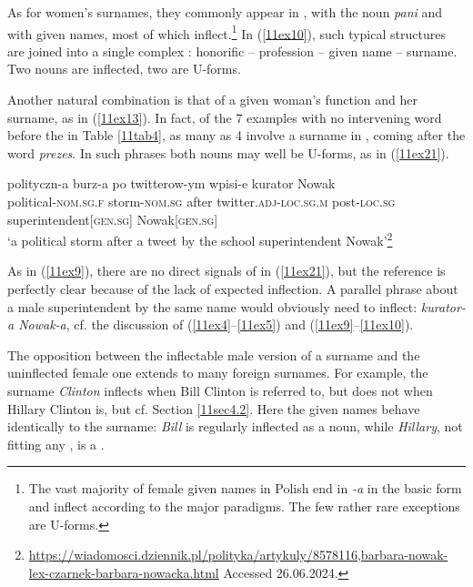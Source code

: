\documentclass[output=paper,colorlinks,citecolor=brown]{langscibook}
\begin{document}
As for women's surnames, they commonly appear in , with the noun \emph{pani} and with given names, most of which inflect.\footnote{The vast majority of female given names in Polish end in \emph{-a} in the basic form and inflect according to the major  paradigms. The few rather rare exceptions are U-forms.\label{11ftn18}} In (\ref{11ex10}), such typical structures are joined into a single complex : honorific -- profession -- given name -- surname. Two nouns are inflected, two are U-forms.

Another natural combination is that of a given woman's function and her surname, as in (\ref{11ex13}). In fact, of the 7 examples with no intervening word before the  in Table \ref{11tab4}, as many as 4 involve a surname in , coming after the word \emph{prezes}. In such phrases both nouns may well be U-forms, as in (\ref{11ex21}).

\begin{exe}
	\ex \label{11ex21}
	\gll polityczn-a burz-a po twitterow-ym wpisi-e kurator Nowak \\
	political-\textsc{nom.sg.f} storm-\textsc{nom.sg} after twitter.\textsc{adj-loc.sg.m} post-\textsc{loc.sg} superintendent[\textsc{gen.sg}] Nowak[\textsc{gen.sg}] \\
	\trans ‘a political storm after a tweet by the school superintendent Nowak’\footnote{\url{https://wiadomosci.dziennik.pl/polityka/artykuly/8578116,barbara-nowak-lex-czarnek-barbara-nowacka.html} Accessed 26.06.2024.}
\end{exe}

As in (\ref{11ex9}), there are no direct signals of   in (\ref{11ex21}), but the  reference is perfectly clear because of the lack of expected inflection. A parallel phrase about a male superintendent by the same name would obviously need to inflect: \emph{kurator-a Nowak-a}, cf. the discussion of (\ref{11ex4}--\ref{11ex5}) and (\ref{11ex9}--\ref{11ex10}).

The opposition between the inflectable male version of a surname and the uninflected female one extends to many foreign surnames. For example, the surname \emph{Clinton} inflects when Bill Clinton is referred to, but does not when Hillary Clinton is, but cf. Section \ref{11sec4.2}. Here the given names behave identically to the surname: \emph{Bill} is regularly inflected as a  noun, while \emph{Hillary}, not fitting any  , is a .
\end{document}
